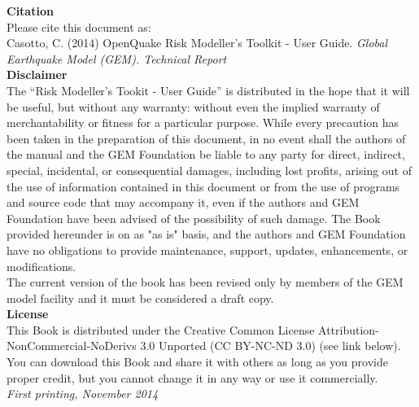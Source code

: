 \noindent
   {\textbf{Citation}} \hfill \\
   Please cite this document as:\\
   Casotto, C. (2014) OpenQuake Risk Modeller's Toolkit - User Guide. \textit{Global Earthquake Model (GEM). Technical Report}\\

   {\bf{Disclaimer}} \hfill \\
\noindent
   The ``Risk Modeller's Tookit - User Guide'' is distributed in the hope 
   that it will be useful, but without any warranty: without 
   even the implied warranty of merchantability or fitness for a 
   particular purpose. While every 
   precaution has been taken in the preparation of this document, in 
   no event shall the authors of the manual and the GEM Foundation be 
   liable to any party for direct, indirect, special, incidental, or 
   consequential damages, including lost profits, arising out of the 
   use of information contained in this document or from the use of 
   programs and source code that may accompany it, even if the authors 
   and GEM Foundation have been advised of the possibility of such damage. 
   The Book provided hereunder is on as "as is" basis, and the authors 
   and GEM Foundation have no obligations to provide maintenance, support,
   updates, enhancements, or modifications. 
   \hfill \\
   The current version of the book has been revised only by members of 
   the GEM model facility and it must be considered a draft copy. 
   \vspace{0.4cm} \hfill \\
   {\bf{License}} \hfill \\
   This Book is distributed under the Creative Common License 
   Attribution-NonCommercial-NoDerivs 3.0 Unported (CC BY-NC-ND 3.0) 
   (see link below). You can download this Book and share it with 
   others as long as you provide proper credit, but you cannot change 
   it in any way or use it commercially. 
   \hfill \\

\noindent \textit{First printing, November 2014} %



